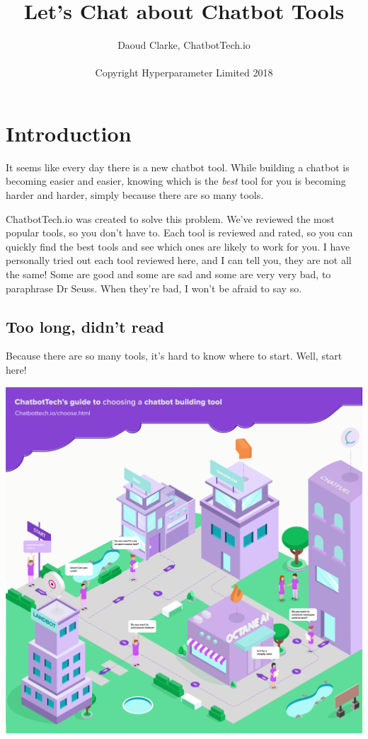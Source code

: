 \documentclass[ebook,article,11pt]{memoir}
\author{Daoud Clarke, ChatbotTech.io\\
  \\
  Copyright Hyperparameter Limited 2018}
\title{\textbf{Let's Chat about Chatbot Tools}}
\date{}
\begin{document}
\maketitle

\chapter{Introduction}

It seems like every day there is a new chatbot tool. While building a
chatbot is becoming easier and easier, knowing which is the
\emph{best} tool for you is becoming harder and harder, simply because
there are so many tools.

ChatbotTech.io was created to solve this problem. We've reviewed the
most popular tools, so you don't have to. Each tool is reviewed and
rated, so you can quickly find the best tools and see which ones are
likely to work for you. I have personally tried out each tool reviewed
here, and I can tell you, they are not all the same! Some are good and
some are sad and some are very very bad, to paraphrase Dr Seuss. When
they're bad, I won't be afraid to say so.

\section{Too long, didn't read}

Because there are so many tools, it's hard to know where to
start. Well, start here!

\begin{center}
\includegraphics[width=\textwidth]{guide.png}
\end{center}
\end{document}
